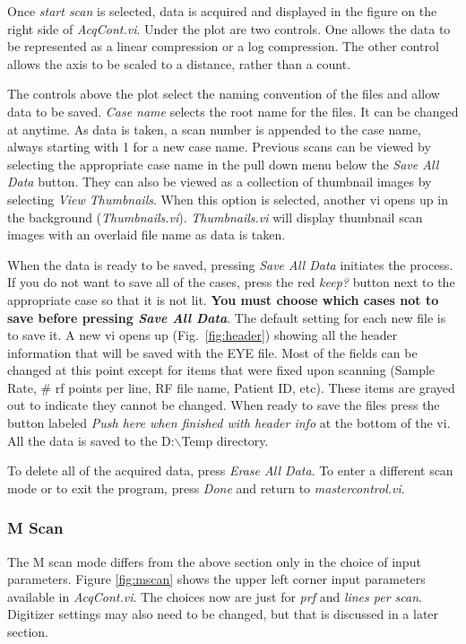 \documentclass[10pt]{article}
\begin{document}
Once {\it start scan} is selected, data is acquired and displayed
in the figure on the right side of {\it AcqCont.vi}. Under the
plot are two controls. One allows the data to be represented as a
linear compression or a log compression. The other control allows
the axis to be scaled to a distance, rather than a count.

The controls above the plot select the naming convention of the
files and allow data to be saved. {\it Case name} selects the root
name for the files. It can be changed at anytime. As data is
taken, a scan number is appended to the case name, always starting
with 1 for a new case name. Previous scans can be viewed by
selecting the appropriate case name in the pull down menu below
the {\it Save All Data} button. They can also be viewed as a
collection of thumbnail images by selecting {\it View Thumbnails}.
When this option is selected, another vi opens up in the
background ({\it Thumbnails.vi}). {\it Thumbnails.vi} will display
thumbnail scan images with an overlaid file name as data is taken.

When the data is ready to be saved, pressing {\it Save All Data}
initiates the process. If you do not want to save all of the
cases, press the red {\it keep?} button next to the appropriate
case so that it is not lit. {\bf You must choose which cases not
to save before pressing {\it Save All Data}}. The default setting
for each new file is to save it. A new vi opens up
(Fig.~\ref{fig:header}) showing all the header information that
will be saved with the EYE file. Most of the fields can be changed
at this point except for items that were fixed upon scanning
(Sample Rate, \# rf points per line, RF file name, Patient ID,
etc). These items are grayed out to indicate they cannot be
changed. When ready to save the files press the button labeled
{\it Push here when finished with header info} at the bottom of
the vi. All the data is saved to the D:$\backslash$Temp directory.

To delete all of the acquired data, press {\it Erase All Data}. To
enter a different scan mode or to exit the program, press {\it
Done} and return to {\it mastercontrol.vi}.

\subsubsection{M Scan}

The M scan mode differs from the above section only in the choice
of input parameters. Figure \ref{fig:mscan} shows the upper left
corner input parameters available in {\it AcqCont.vi}. The choices
now are just for {\it prf} and {\it lines per scan}. Digitizer
settings may also need to be changed, but that is discussed in a
later section.
\end{document}
